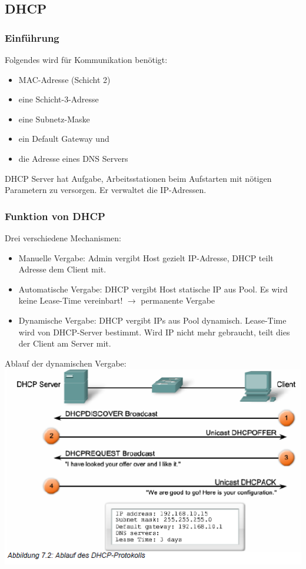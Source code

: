 \documentclass[landscape,twocolumn,a4paper]{article}
\newcommand{\ra}{\rightarrow}
\begin{document}
\begin{footnotesize}
\subsection{DHCP}
\subsubsection{Einführung}
Folgendes wird für Kommunikation benötigt:
\vspace{-3mm}
\begin{itemize}
	\item MAC-Adresse (Schicht 2)
	\item eine Schicht-3-Adresse
	\item eine Subnetz-Maske
	\item ein Default Gateway und
	\item die Adresse eines DNS Servers
\end{itemize}
\vspace{-3mm}
DHCP Server hat Aufgabe, Arbeitsstationen beim Aufstarten mit nötigen Parametern zu versorgen. Er verwaltet die IP-Adressen.
\subsubsection{Funktion von DHCP}
Drei verschiedene Mechanismen:
\begin{itemize}
	\item Manuelle Vergabe: Admin vergibt Host gezielt IP-Adresse, DHCP teilt Adresse dem Client mit.
	\item Automatische Vergabe: DHCP vergibt Host statische IP aus Pool. Es wird keine Lease-Time vereinbart! $\ra$ permanente Vergabe
	\item Dynamische Vergabe: DHCP vergibt IPs aus Pool dynamisch. Lease-Time wird von DHCP-Server bestimmt. Wird IP nicht mehr gebraucht, teilt dies der Client am Server mit.
\end{itemize}
Ablauf der dynamischen Vergabe:\\
\includegraphics[scale=0.5]{ablauf-dhcp-protokoll.png}


\end{footnotesize}
\end{document}
